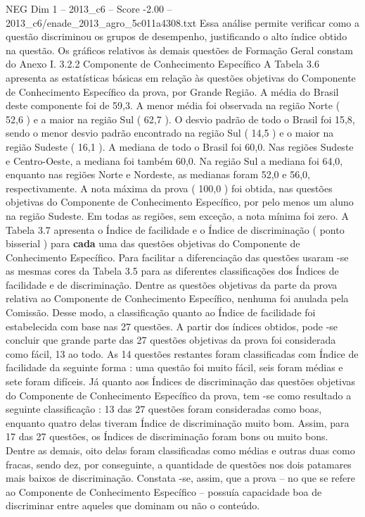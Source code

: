 \begin{textsample}{NEG Dim 1 – 2013\_c6 – Score -2.00 – 2013\_c6/enade\_2013\_agro\_5c011a4308.txt}
Essa análise permite verificar como a questão discriminou os grupos de desempenho, justificando o alto índice obtido na questão.
Os gráficos relativos às demais questões de Formação Geral constam do Anexo I. 3.2.2 Componente de Conhecimento Específico A Tabela 3.6 apresenta as estatísticas básicas em relação às questões objetivas do Componente de Conhecimento Específico da prova, por Grande Região.
A média do Brasil deste componente foi de 59,3.
A menor média foi observada na região Norte ( 52,6 ) e a maior na região Sul ( 62,7 ).
O desvio padrão de todo o Brasil foi 15,8, sendo o menor desvio padrão encontrado na região Sul ( 14,5 ) e o maior na região Sudeste ( 16,1 ).
A mediana de todo o Brasil foi 60,0.
Nas regiões Sudeste e Centro-Oeste, a mediana foi também 60,0.
Na região Sul a mediana foi 64,0, enquanto nas regiões Norte e Nordeste, as medianas foram 52,0 e 56,0, respectivamente.
A nota máxima da prova ( 100,0 ) foi obtida, nas questões objetivas do Componente de Conhecimento Específico, por pelo menos um aluno na região Sudeste.
Em todas as regiões, sem exceção, a nota mínima foi zero.
A Tabela 3.7 apresenta o Índice de facilidade e o Índice de discriminação ( ponto bisserial ) para \textbf{cada} uma das questões objetivas do Componente de Conhecimento Específico.
Para facilitar a diferenciação das questões usaram -se as mesmas cores da Tabela 3.5 para as diferentes classificações dos Índices de facilidade e de discriminação.
Dentre as questões objetivas da parte da prova relativa ao Componente de Conhecimento Específico, nenhuma foi anulada pela Comissão.
Desse modo, a classificação quanto ao Índice de facilidade foi estabelecida com base nas 27 questões.
A partir dos índices obtidos, pode -se concluir que grande parte das 27 questões objetivas da prova foi considerada como fácil, 13 ao todo.
As 14 questões restantes foram classificadas com Índice de facilidade da seguinte forma : uma questão foi muito fácil, seis foram médias e sete foram difíceis.
Já quanto aos Índices de discriminação das questões objetivas do Componente de Conhecimento Específico da prova, tem -se como resultado a seguinte classificação : 13 das 27 questões foram consideradas como boas, enquanto quatro delas tiveram Índice de discriminação muito bom.
Assim, para 17 das 27 questões, os Índices de discriminação foram bons ou muito bons.
Dentre as demais, oito delas foram classificadas como médias e outras duas como fracas, sendo dez, por conseguinte, a quantidade de questões nos dois patamares mais baixos de discriminação.
Constata -se, assim, que a prova – no que se refere ao Componente de Conhecimento Específico – possuía capacidade boa de discriminar entre aqueles que dominam ou não o conteúdo.

\end{textsample}
